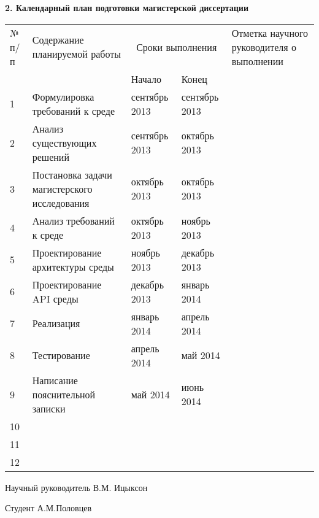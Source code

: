 \begin{center}

\textbf{2. Календарный план подготовки магистерской диссертации}

\vspace{1em}

\begin{tabularx}{\textwidth}{| p{0.5cm} | p{5.5cm} | X | X | p{3cm} |}
\hline
№ п/п & Содержание планируемой работы & \multicolumn{2}{|c|}{Сроки выполнения}
& Отметка \mbox{научного} \mbox{руководителя} о выполнении \\ \cline{3-4}
& & Начало & Конец & \\ \hline
1 & Формулировка требований к среде & сентябрь 2013 & сентябрь 2013 & \\ \hline
2 & Анализ существующих решений & сентябрь 2013 & октябрь 2013 & \\ \hline
3 & Постановка задачи магистерского исследования & октябрь 2013 & октябрь 2013 & \\ \hline
4 & Анализ требований к среде & октябрь 2013 & ноябрь 2013 & \\ \hline
5 & Проектирование архитектуры среды & ноябрь 2013 & декабрь 2013 & \\ \hline
6 & Проектирование API среды & декабрь 2013 & январь 2014 & \\ \hline
7 & Реализация & январь 2014 & апрель 2014 & \\ \hline
8 & Тестирование & апрель 2014 & май 2014 & \\ \hline
9 & Написание пояснительной записки & май 2014 & июнь 2014 & \\ \hline
10 & & & & \\ \hline
11 & & & & \\ \hline
12 & & & & \\ \hline
\end{tabularx}

\end{center}

\vspace{1em}

Научный руководитель \uline{\hfill} В.М. Ицыксон

\vspace{1em}

Студент \uline{\hfill} А.М.Половцев
